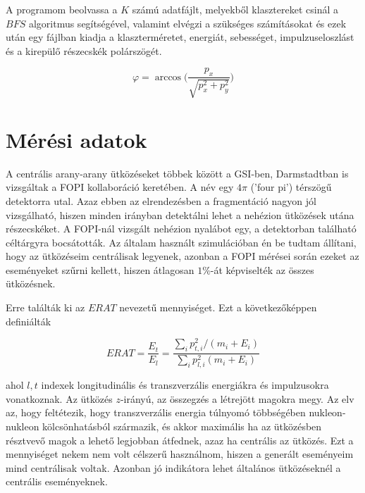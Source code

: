 \documentclass[a4paper,12pt]{article}
\begin{document}
\vspace{5mm}

\par A programom beolvassa a $K$ számú adatfájlt, melyekből klasztereket csinál a $BFS$ algoritmus segítségével, valamint elvégzi a szükséges számításokat és ezek után egy fájlban kiadja a klaszterméretet, energiát, sebességet, impulzuseloszlást és a kirepülő részecskék polárszögét.

\vspace{5mm}

\begin{equation}
\varphi = \arccos\Big(\frac{p_{x}}{\sqrt{p_{x}^{2} + p_{y}^{2}}}\Big)
\end{equation}

\vspace{5mm}

\section{ Mérési adatok}

\par A centrális arany-arany ütközéseket többek között a GSI-ben, Darmstadtban is vizsgáltak a FOPI kollaboráció keretében. A név egy $4\pi$ ('four pi') térszögű detektorra utal. Azaz ebben az elrendezésben a fragmentáció nagyon jól vizsgálható, hiszen minden irányban detektálni lehet a nehézion ütközések utána részecskéket. A FOPI-nál vizsgált nehézion nyalábot egy, a detektorban található céltárgyra bocsátották. Az általam használt szimulációban én be tudtam állítani, hogy az ütközéseim centrálisak legyenek, azonban a FOPI mérései során ezeket az eseményeket szűrni kellett, hiszen átlagosan $1\%$-át képviselték az összes ütközésnek.

\vspace{5mm}

\par Erre találták ki az $ERAT$ nevezetű mennyiséget. Ezt a következőképpen definiálták

\vspace{5mm}

\begin{equation}
ERAT = \frac{E_{t}}{E_{l}} = \frac{\sum_{i} p_{t,i}^{2}/(m_{i} + E_{i})}{\sum_{i} p_{l,i}^{2}(m_{i} + E_{i})}
\end{equation}

\vspace{5mm}

\par ahol $l,t$ indexek longitudinális és transzverzális energiákra és impulzusokra vonatkoznak. Az ütközés $z$-irányú, az összegzés a létrejött magokra megy. Az elv az, hogy feltétezik, hogy transzverzális energia túlnyomó többségében nukleon-nukleon kölcsönhatásból származik, és akkor maximális ha az ütközésben résztvevő magok a lehető legjobban átfednek, azaz ha centrális az ütközés. Ezt a mennyiséget nekem nem volt célszerű használnom, hiszen a generált eseményeim mind centrálisak voltak. Azonban jó indikátora lehet általános ütközéseknél a centrális eseményeknek.
\end{document}
